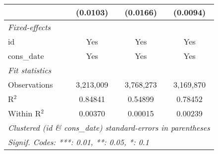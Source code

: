 \begin{tabular}{lccc}
                                                             & (0.0103)        & (0.0166)       & (0.0094)\\
   \midrule \emph{Fixed-effects} &   &   &  \\
   id                                                        & Yes             & Yes            & Yes\\
   cons\_date                                               & Yes             & Yes            & Yes\\
   \midrule \emph{Fit statistics} &   &   &  \\
   Observations                                              & 3,213,009       & 3,768,273      & 3,169,870\\
   R$^2$                                                     & 0.84841         & 0.54899        & 0.78452\\
   Within R$^2$                                              & 0.00370         & 0.00015        & 0.00239\\
   \midrule\midrule\multicolumn{4}{l}{\emph{Clustered (id \& cons\_date) standard-errors in parentheses}}\\
   \multicolumn{4}{l}{\emph{Signif. Codes: ***: 0.01, **: 0.05, *: 0.1}}\\
\end{tabular}


